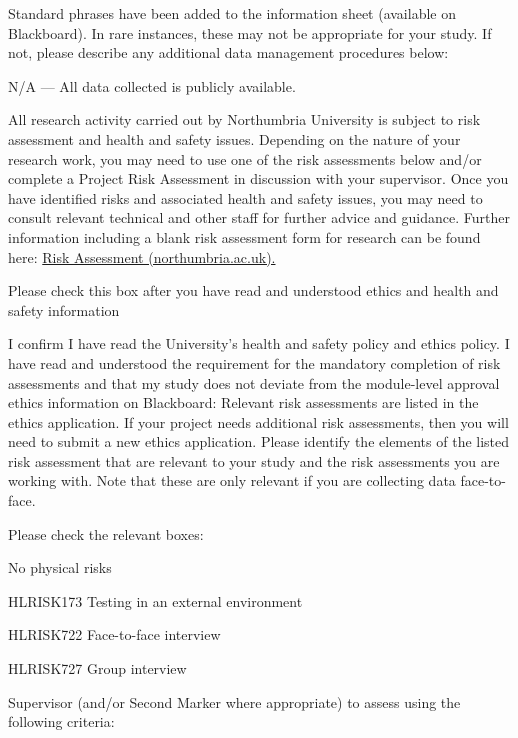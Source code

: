 \documentclass[../CHEFCookingHelperForEveryonesFridge.tex]{subfiles}
\begin{document}
Standard phrases have been added to the information sheet (available on Blackboard). In rare instances,
these may not be appropriate for your study. If not,
please describe any additional data management procedures below:

N/A --- All data collected is publicly available.

All research activity carried out by Northumbria University is subject to risk assessment and health and safety
issues. Depending on the nature of your research work, you may need to use one of the risk assessments below
and/or complete a Project Risk Assessment in discussion with your supervisor. Once you have identified risks
and associated health and safety issues, you may need to consult relevant technical and other staff for further
advice and guidance. Further information including a blank risk assessment form for research can be found here:
\href{https://www.northumbria.ac.uk/about-us/health-safety-resources/risk-assessment/}{Risk Assessment (northumbria.ac.uk).}

Please check this box after you have read and understood ethics and health and safety information

   I confirm I have read the University's health and safety policy and ethics policy.
I have read and understood the requirement for the mandatory completion of risk assessments and that my study
does not deviate from the module-level approval ethics information on Blackboard: Relevant risk assessments
are listed in the ethics application. If your project needs additional risk assessments, then you will need
to submit a new ethics application. Please identify the elements of the listed risk assessment that are relevant
to your study and the risk assessments you are working with. Note that these are only relevant if you are
collecting data face-to-face.

Please check the relevant boxes:

   No physical risks

   HL\textunderscore{}RISK\textunderscore{}173 Testing in an external environment

   HL\textunderscore{}RISK\textunderscore{}722 Face-to-face interview

   HL\textunderscore{}RISK\textunderscore{}727 Group interview

Supervisor (and/or Second Marker where appropriate) to assess using the following criteria:
\end{document}
